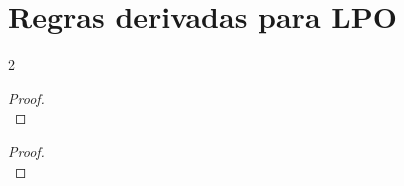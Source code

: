 \begin{minipage}{\textwidth} %
\section{Regras derivadas para LPO}

\begin{multicols}{2}
\begin{proof}
\\	
\end{proof}
\begin{proof}
\\	
\end{proof}
\end{multicols}
\end{minipage}
